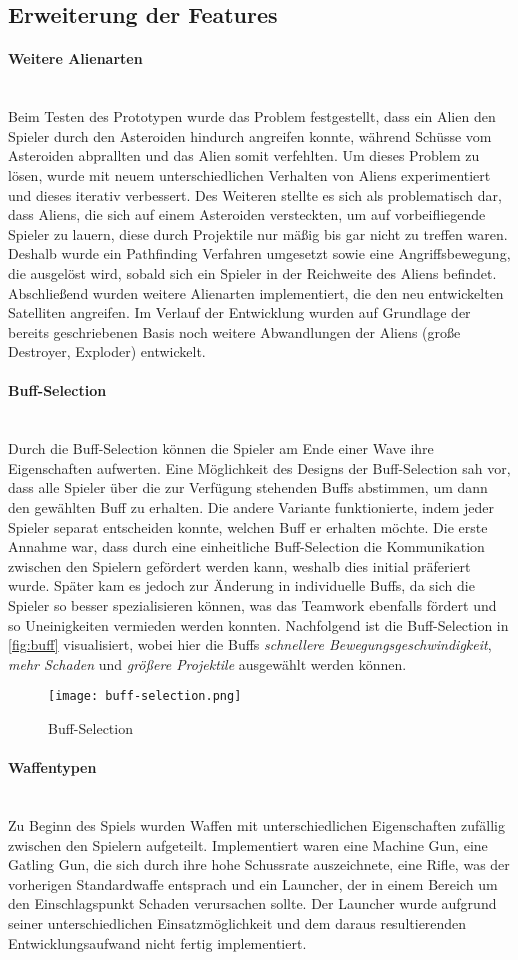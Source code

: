 \documentclass[11pt]{scrartcl}
\newcommand{\lbparagraph}[1]{\paragraph*{#1}\mbox{}\\}
\begin{document}
\subsection{Erweiterung der Features}
\lbparagraph{Weitere Alienarten}
Beim Testen des Prototypen wurde das Problem festgestellt, dass ein Alien den Spieler durch den Asteroiden hindurch angreifen konnte, während Schüsse vom Asteroiden abprallten und das Alien somit verfehlten. Um dieses Problem zu lösen, wurde mit neuem unterschiedlichen Verhalten von Aliens experimentiert und dieses iterativ verbessert.
Des Weiteren stellte es sich als problematisch dar, dass Aliens, die sich auf einem Asteroiden versteckten, um auf vorbeifliegende Spieler zu lauern, diese durch Projektile nur mäßig bis gar nicht zu treffen waren. Deshalb wurde ein Pathfinding Verfahren umgesetzt sowie eine Angriffsbewegung, die ausgelöst wird, sobald sich ein Spieler in der Reichweite des Aliens befindet. Abschließend wurden weitere Alienarten implementiert, die den neu entwickelten Satelliten angreifen. Im Verlauf der Entwicklung wurden auf Grundlage der bereits geschriebenen Basis noch weitere Abwandlungen der Aliens (große Destroyer, Exploder) entwickelt.

\lbparagraph{Buff-Selection}
Durch die Buff-Selection können die Spieler am Ende einer Wave ihre Eigenschaften aufwerten. Eine Möglichkeit des Designs der Buff-Selection sah vor, dass alle Spieler über die zur Verfügung stehenden Buffs abstimmen, um dann den gewählten Buff zu erhalten. Die andere Variante funktionierte, indem jeder Spieler separat entscheiden konnte, welchen Buff er erhalten möchte. Die erste Annahme war, dass durch eine einheitliche Buff-Selection die Kommunikation zwischen den Spielern gefördert werden kann, weshalb dies initial präferiert wurde.
Später kam es jedoch zur Änderung in individuelle Buffs, da sich die Spieler so besser
spezialisieren können, was das Teamwork ebenfalls fördert und so Uneinigkeiten vermieden
werden konnten. Nachfolgend ist die Buff-Selection in \autoref{fig:buff} visualisiert,
wobei hier die Buffs \textit{schnellere Bewegungsgeschwindigkeit}, \textit{mehr Schaden}
und \textit{größere Projektile} ausgewählt werden können.

\begin{figure}[htp]
	\centering
	\texttt{[image: buff-selection.png]}
	\caption{Buff-Selection}
	\label{fig:buff}
\end{figure}


\lbparagraph{Waffentypen}
Zu Beginn des Spiels wurden Waffen mit unterschiedlichen Eigenschaften zufällig zwischen den Spielern aufgeteilt. Implementiert waren eine Machine Gun, eine Gatling Gun, die sich durch ihre hohe Schussrate auszeichnete, eine Rifle, was der vorherigen Standardwaffe entsprach und ein Launcher, der in einem Bereich um den Einschlagspunkt Schaden verursachen sollte. Der Launcher wurde aufgrund seiner unterschiedlichen Einsatzmöglichkeit und dem daraus resultierenden Entwicklungsaufwand nicht fertig implementiert.
\end{document}
